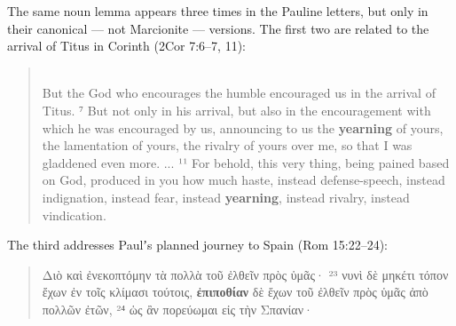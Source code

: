 The same noun lemma appears three times in the Pauline letters, %
but only in their canonical --- not Marcionite --- versions. %
The first two are related to the arrival of Titus in Corinth (2Cor 7:6--7, 11): %

\vspace*{3mm} 
 \begin{quote} \\[1mm] %
 But the God who encourages the humble encouraged us in the arrival of Titus. %
 ⁷ But not only in his arrival, but also in the %
 encouragement with which he was encouraged by us, %
 announcing to us the \textbf{yearning} of yours, %
 the lamentation of yours, %
 the rivalry of yours over me, so that I was gladdened even more. ... %
 ¹¹ For behold, this very thing, being pained based on God, %
 produced in you how much haste, %
 instead defense-speech, instead indignation, instead fear, %
 instead \textbf{yearning}, instead rivalry, instead vindication. \end{quote} %
 \vspace*{1mm}

\noindent{}The third addresses Paulʼs planned journey to Spain (Rom 15:22--24): %

 \vspace*{3mm} 
  \begin{quote}Διὸ καὶ ἐνεκοπτόμην τὰ πολλὰ τοῦ ἐλθεῖν πρὸς ὑμᾶς· %
    ²³ νυνὶ δὲ μηκέτι τόπον ἔχων ἐν τοῖς κλίμασι τούτοις, %
 \textbf{ἐπιποθίαν} δὲ ἔχων τοῦ ἐλθεῖν πρὸς ὑμᾶς ἀπὸ πολλῶν ἐτῶν, %
 ²⁴ ὡς ἂν πορεύωμαι εἰς τὴν Σπανίαν· \\[1mm] %
 \end{quote} %
  \vspace*{3mm}

